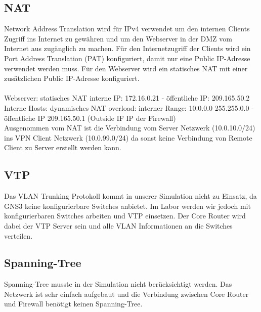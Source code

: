 \documentclass[11pt,a4paper,parskip=half]{scrartcl}
\begin{document}
\subsection{NAT}
Network Address Translation wird für IPv4 verwendet um den internen Clients Zugriff ins Internet zu gewähren und um den Webserver in der DMZ vom Internet aus zugänglich zu machen. Für den Internetzugriff der Clients wird ein Port Address Translation (PAT) konfiguriert, damit nur eine Public IP-Adresse verwendet werden muss. Für den Webserver wird ein statisches NAT mit einer zusätzlichen Public IP-Adresse konfiguriert.\\\\
Webserver: statisches NAT interne IP: 172.16.0.21 - öffentliche IP: 209.165.50.2\\
Interne Hosts: dynamisches NAT overload: interner Range: 10.0.0.0 255.255.0.0 - öffentliche IP 209.165.50.1 (Outside IF IP der Firewall)\\
Ausgenommen vom NAT ist die Verbindung vom Server Netzwerk (10.0.10.0/24) ins VPN Client Netzwerk (10.0.99.0/24) da sonst keine Verbindung von Remote Client zu Server erstellt werden kann.

\subsection{VTP}
Das VLAN Trunking Protokoll kommt in unserer Simulation nicht zu Einsatz, da GNS3 keine konfigurierbare Switches anbietet. Im Labor werden wir jedoch mit konfigurierbaren Switches arbeiten und VTP einsetzen. Der Core Router wird dabei der VTP Server sein und alle VLAN Informationen an die Switches verteilen.

\subsection{Spanning-Tree}
Spanning-Tree musste in der Simulation nicht berücksichtigt werden. Das Netzwerk ist sehr einfach aufgebaut und die Verbindung zwischen Core Router und Firewall benötigt keinen Spanning-Tree.
\end{document}
